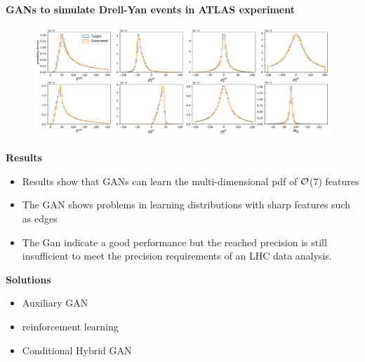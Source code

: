 \documentclass[11pt,aspectratio=169]{beamer}
\begin{document}
\begin{frame}{\underline{\secname}}
	
	
	\begin{center}
		\textbf{GANs to simulate Drell-Yan events in  ATLAS experiment}
	\end{center}	
	
	
\begin{figure}[H]
	\begin{center}
		\includegraphics[width=\textwidth]{slides/trial9_epoch39700_minigantest_mllloss_final}
	\end{center}
\end{figure}
	
	


	
\end{frame}

\begin{frame}{\underline{\secname}}
	
	
	\begin{center}
		\textbf{Results}
	\end{center}	
	
			\begin{itemize}			  \setlength\itemsep{0em}
\item
	Results show that GANs can learn the multi-dimensional pdf of $\cal{O}$(7) features
\item
The GAN shows problems in learning distributions with sharp features such as edges
\item
 The Gan indicate a good performance but the reached precision is still insufficient to meet the precision requirements of an LHC data analysis.
			\end{itemize}

 	\begin{center}
		\textbf{Solutions}
	\end{center}
			\begin{itemize}			  \setlength\itemsep{0em}
\item Auxiliary GAN
\item reinforcement learning

\item  Conditional Hybrid GAN

			\end{itemize}
	
\end{frame}
\end{document}
